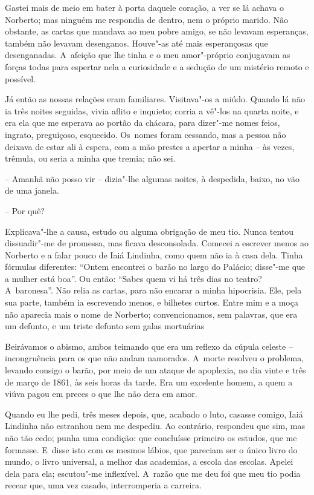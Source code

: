Gastei mais de meio em bater à porta daquele coração, a ver se lá achava
o Norberto; mas ninguém me respondia de dentro, nem o próprio marido.
Não obstante, as cartas que mandava ao meu pobre amigo, se não levavam
esperanças, também não levavam desenganos. Houve"-as até mais
esperançosas que desenganadas. A~afeição que lhe tinha e o meu
amor"-próprio conjugavam as forças todas para espertar nela a curiosidade
e a sedução de um mistério remoto e possível.

Já então as nossas relações eram familiares. Visitava"-os a miúdo. Quando
lá não ia três noites seguidas, vivia aflito e inquieto; corria a vê"-los
na quarta noite, e era ela que me esperava ao portão da chácara, para
dizer"-me nomes feios, ingrato, preguiçoso, esquecido. Os~nomes foram
cessando, mas a pessoa não deixava de estar ali à espera, com a mão
prestes a apertar a minha -- às vezes, trêmula, ou seria a minha que
tremia; não sei.

-- Amanhã não posso vir -- dizia"-lhe algumas noites, à despedida, baixo,
no vão de uma janela.

-- Por quê?

Explicava"-lhe a causa, estudo ou alguma obrigação de meu tio. Nunca
tentou dissuadir"-me de promessa, mas ficava desconsolada. Comecei a
escrever menos ao Norberto e a falar pouco de Iaiá Lindinha, como quem
não ia à casa dela. Tinha fórmulas diferentes: ``Ontem encontrei o barão
no largo do Palácio; disse"-me que a mulher está boa''. Ou então: ``Sabes
quem vi há três dias no teatro? A~baronesa''. Não relia as cartas, para
não encarar a minha hipocrisia. Ele, pela sua parte, também ia
escrevendo menos, e bilhetes curtos. Entre mim e a moça não aparecia
mais o nome de Norberto; convencionamos, sem palavras, que era um
defunto, e um triste defunto sem galas mortuárias

Beirávamos o abismo, ambos teimando que era um reflexo da cúpula celeste
-- incongruência para os que não andam namorados. A~morte resolveu o
problema, levando consigo o barão, por meio de um ataque de apoplexia,
no dia vinte e três de março de 1861, às seis horas da tarde. Era um
excelente homem, a quem a viúva pagou em preces o que lhe não dera em
amor.

Quando eu lhe pedi, três meses depois, que, acabado o luto, casasse
comigo, Iaiá Lindinha não estranhou nem me despediu. Ao contrário,
respondeu que sim, mas não tão cedo; punha uma condição: que concluísse
primeiro os estudos, que me formasse. E~disse isto com os mesmos lábios,
que pareciam ser o único livro do mundo, o livro universal, a melhor das
academias, a escola das escolas. Apelei dela para ela; escutou"-me
inflexível. A~razão que me deu foi que meu tio podia recear que, uma vez
casado, interromperia a carreira.


